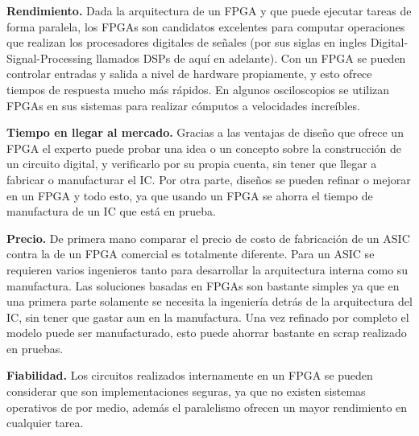 \documentclass[twoside,spanish,ESP,MSc]{plantillaLabUPV}
\theoremstyle{definition}
\newcommand{\f}{FPGA }
\newcommand{\fs}{FPGAs }
\begin{document}
\checkmark\textbf{Rendimiento.} Dada la arquitectura de un \f y que puede ejecutar tareas de forma paralela, los \fs son candidatos excelentes para computar operaciones que realizan los procesadores digitales de señales (por sus siglas en ingles Digital-Signal-Processing llamados DSPs de aquí en adelante). Con un \f se pueden controlar entradas y salida a nivel de hardware propiamente, y esto ofrece tiempos de respuesta mucho más rápidos. En algunos osciloscopios se utilizan \fs en sus sistemas para realizar cómputos a velocidades increíbles.

\checkmark\textbf{Tiempo en llegar al mercado.} Gracias a las ventajas de diseño que ofrece un \f el experto puede probar una idea o un concepto sobre la construcción de un circuito digital, y verificarlo por su propia cuenta, sin tener que llegar a fabricar o manufacturar el IC. Por otra parte, diseños se pueden refinar o mejorar en un FPGA y todo esto, ya que usando un \f se ahorra el tiempo de manufactura de un IC que está en prueba.


\checkmark\textbf{Precio.} De primera mano comparar el precio de costo de fabricación de un ASIC contra la de un \f comercial es totalmente diferente. Para un ASIC se requieren varios ingenieros tanto para desarrollar la arquitectura interna como su manufactura. Las soluciones basadas en \fs son bastante simples ya que en una primera parte solamente se necesita la ingeniería detrás de la arquitectura del IC, sin tener que gastar aun en la manufactura. Una vez refinado por completo el modelo puede ser manufacturado, esto puede ahorrar bastante en scrap realizado en pruebas.%


\checkmark\textbf{Fiabilidad.} Los circuitos realizados internamente en un \f se pueden considerar que son implementaciones seguras, ya que no existen sistemas operativos de por medio, además el paralelismo ofrecen un mayor rendimiento en cualquier tarea. 
\end{document}
